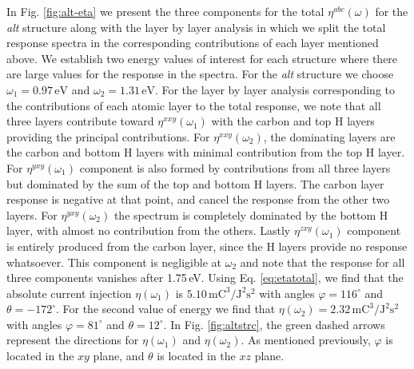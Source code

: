 \documentclass[pss]{wiley2sp} %
\begin{document}
In Fig. \ref{fig:alt-eta} we present the three components for the total
$\eta^{abc}(\omega)$ for the 
\emph{alt} structure along with the layer by layer analysis in which we split
the total response spectra in the corresponding contributions of each layer
mentioned above. We establish two energy values of interest for each structure
where there are large values for the response in the spectra. For the
\emph{alt} structure we choose $\omega_{1} = 0.97\,\mathrm{eV}$ and $\omega_{2} =
1.31\,\mathrm{eV}$. For the layer by layer analysis corresponding to the
contributions of each atomic layer to the total response, we note that all
three layers contribute toward $\eta^{xxy}(\omega_{1})$ with the carbon
and top H layers providing the principal contributions. For $\eta^{xxy}(\omega_{2})$, the
dominating layers are the carbon and bottom H layers with minimal contribution
from the top H layer. For $\eta^{yxy}(\omega_{1})$ component is also
formed by contributions from all three layers but dominated by the sum of the
top and bottom H layers. The carbon layer response is negative at that point,
and cancel the response from the other two layers. For
$\eta^{yxy}(\omega_{2})$ the spectrum is completely dominated by the bottom H layer, with
almost no contribution from the others. Lastly 
$\eta^{zxy}(\omega_{1})$ component is entirely produced from the carbon layer,
since the H layers provide no response whatsoever. This component is negligible
at $\omega_{2}$ and note that the response for all three components vanishes after
1.75\,eV. Using Eq. \eqref{eq:etatotal}, we find that the absolute current
injection $\eta(\omega_{1})$ is
$5.10\,\mathrm{mC}^{3}/\mathrm{J}^{2}\mathrm{s}^{2}$ with angles
$\varphi=116^{\circ}$ and $\theta=-172^{\circ}$. For the second value of energy we find that
$\eta(\omega_{2})=2.32\,\mathrm{mC}^{3}/\mathrm{J}^{2}\mathrm{s}^{2}$ with angles
$\varphi=81^{\circ}$ and $\theta=12^{\circ}$. In Fig.
\ref{fig:altstrc}, the green dashed arrows represent the directions for
$\eta(\omega_{1})$ and $\eta(\omega_{2})$. As mentioned
previously, $\varphi$ is located in the $xy$ plane, and $\theta$ is located in
the $xz$ plane.
\end{document}
